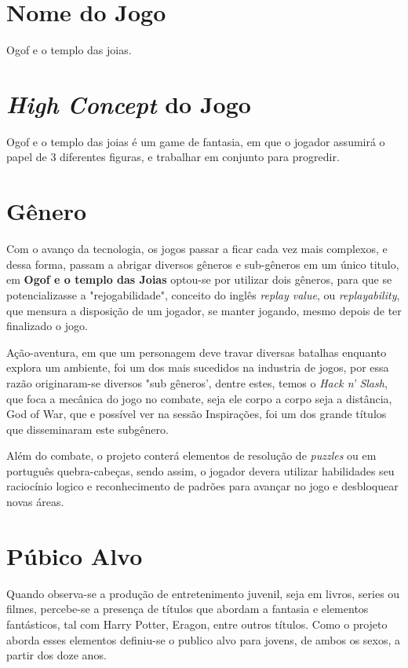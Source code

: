 \section{Nome do Jogo} Ogof e o templo das joias.

\section{\textit{High Concept} do Jogo} Ogof e o templo das joias é um game de
fantasia, em que o jogador assumirá o papel de 3 diferentes figuras, e trabalhar
em conjunto para progredir.

\section{Gênero}
Com o avanço da tecnologia, os jogos passar a ficar cada vez mais complexos, e dessa forma, passam a abrigar diversos gêneros e sub-gêneros em um único titulo, em \textbf{Ogof e o templo das Joias} optou-se por utilizar dois gêneros, para que se potencializasse a "rejogabilidade", conceito do inglês \textit{replay value}, ou \textit{replayability}, que mensura a disposição de um jogador, se manter jogando, mesmo depois de ter finalizado o jogo.

Ação-aventura, em que um personagem deve travar diversas batalhas enquanto explora um ambiente, foi um dos mais sucedidos na industria de jogos, por essa razão originaram-se diversos "sub gêneros', dentre estes, temos o \textit{Hack n' Slash}, que foca a mecânica do jogo no combate, seja ele corpo a corpo seja a distância, God of War, que e possível ver na sessão Inspirações, foi um dos grande títulos que disseminaram este subgênero.

Além do combate, o projeto conterá elementos de resolução de \textit{puzzles} ou em português quebra-cabeças, sendo assim, o jogador devera utilizar habilidades seu raciocínio logico e reconhecimento de padrões para avançar no jogo e desbloquear novas áreas.

\section{Púbico Alvo}

Quando observa-se a produção de entretenimento juvenil, seja em livros, series ou filmes, percebe-se a presença de títulos que abordam a fantasia e elementos fantásticos, tal com Harry Potter, Eragon, entre outros títulos. Como o projeto aborda esses elementos definiu-se o publico alvo para jovens, de ambos os sexos, a partir dos doze anos.

